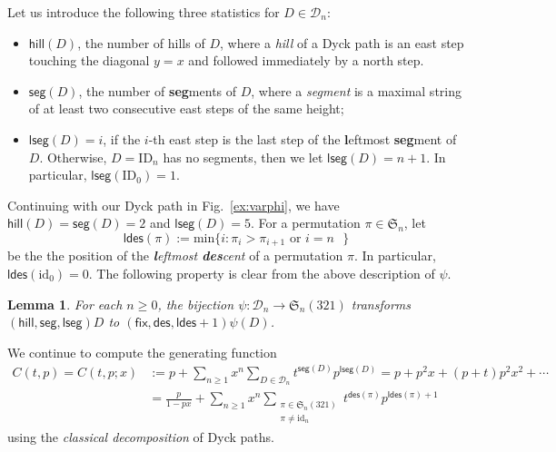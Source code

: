 \documentclass[12pt]{amsart}
\numberwithin{equation}{section}
\theoremstyle{plain}
\newtheorem{lemma}[theorem]{Lemma}
\theoremstyle{definition}
\def\hill{\mathsf{hill}}
\def\id{\mathrm{id}}
\def\ID{\mathrm{ID}}
\def\fix{\mathsf{fix}}
\def\lseg{\mathsf{lseg}}
\def\seg{\mathsf{seg}}
\def\min{\mathrm{min}}
\def\des{\mathsf{des}}
\def\S{\mathfrak{S}}
\def\ldes{\mathsf{ldes}}
\begin{document}
Let us introduce the following three statistics for $D\in\mathcal{D}_n$:
\begin{itemize}
\item $\hill(D)$, the number of hills of $D$, where a {\em hill} of a Dyck path is an east step touching the diagonal $y=x$ and followed immediately by a north step.
\item $\seg(D)$, the number of {\bf seg}ments of $D$, where a {\em segment} is a maximal string of at least two consecutive east steps of the same height;
\item $\lseg(D)=i$,  if the $i$-th east step is the  last  step of the {\bf l}eftmost {\bf seg}ment  of $D$. Otherwise, $D=\ID_n$ has no segments, then we let $\lseg(D)=n+1$. In particular, $\lseg(\ID_0)=1$. 
\end{itemize}
Continuing with our Dyck path in Fig.~\ref{ex:varphi}, we have  $\hill(D)=\seg(D)=2$ and $\lseg(D)=5$. For a permutation $\pi\in\S_n$, let 
\begin{equation}\label{def:ldes}
\ldes(\pi):=\min\{i:\pi_i>\pi_{i+1} \text{ or $i=n$ }\}
\end{equation}
be the the position of the {\em{\bf\em l}eftmost {\bf\em des}cent} of a permutation $\pi$. In particular, $\ldes(\id_0)=0$. The following property is clear from the above description of $\psi$. 

\begin{lemma}\label{lem:kra}
For each $n\ge 0$, the bijection $\psi:\mathcal{D}_n\rightarrow\S_n(321)$ transforms  $(\hill,\seg,\lseg) D$ to $(\fix,\des,\ldes+1)\psi(D)$. 
\end{lemma}

We continue to compute the generating function  
\begin{align*}
C(t,p)=C(t,p;x)&:=p+\sum_{n\geq1}x^n\sum_{D\in\mathcal{D}_n}t^{\seg(D)}p^{\lseg(D)}=p+p^2x+(p+t)p^2x^2+\cdots\\
&=\frac{p}{1-px}+\sum_{n\geq1}x^n\sum_{\substack{\pi\in\S_n(321) \\ \pi\neq\id_n}}t^{\des(\pi)}p^{\ldes(\pi)+1}
\end{align*}
using the {\em classical decomposition} of Dyck paths. 
\end{document}
